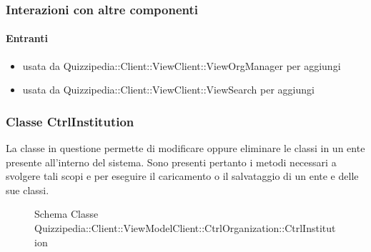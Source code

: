 \subsubsection{Interazioni con altre componenti}
\paragraph{Entranti}
\begin{itemize}
\item usata da Quizzipedia::Client::ViewClient::ViewOrgManager per aggiungi
\item usata da Quizzipedia::Client::ViewClient::ViewSearch per aggiungi
\end{itemize}
\subsubsection{Classe CtrlInstitution}
La classe in questione permette di modificare oppure eliminare le classi in un ente presente all'interno del sistema.
Sono presenti pertanto i metodi necessari a svolgere tali scopi e per eseguire il caricamento o il salvataggio di un ente e delle sue classi.
\begin{figure}[H]
\centering
\noindent{}
\caption[Schema Classe CtrlInstitution]{Schema Classe Quizzipedia::Client::ViewModelClient::CtrlOrganization::CtrlInstitution}
\end{figure}
